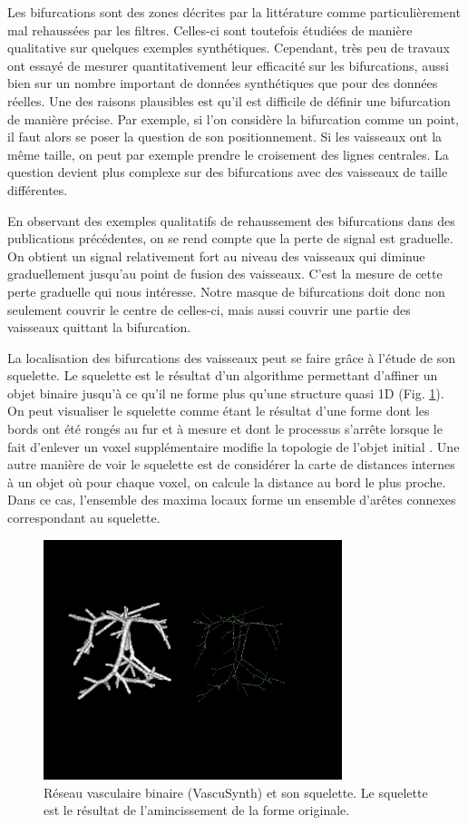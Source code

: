 Les bifurcations sont des zones décrites par la littérature comme particulièrement mal rehaussées par les filtres. Celles-ci sont toutefois étudiées de manière qualitative sur quelques exemples synthétiques. Cependant, très peu de travaux ont essayé de mesurer quantitativement leur efficacité sur les bifurcations, aussi bien sur un nombre important de données synthétiques que pour des données réelles. Une des raisons plausibles est qu'il est difficile de définir une bifurcation de manière précise. Par exemple, si l'on considère la bifurcation comme un point, il faut alors se poser la question de son positionnement. Si les vaisseaux ont la même taille, on peut par exemple prendre le croisement des lignes centrales. La question devient plus complexe sur des bifurcations avec des vaisseaux de taille différentes.

En observant des exemples qualitatifs de rehaussement des bifurcations dans des publications précédentes, on se rend compte que la perte de signal est graduelle. On obtient un signal relativement fort au niveau des vaisseaux qui diminue graduellement jusqu'au point de fusion des vaisseaux. C'est la mesure de cette perte graduelle qui nous intéresse. Notre masque de bifurcations doit donc non seulement couvrir le centre de celles-ci, mais aussi couvrir une partie des vaisseaux quittant la bifurcation.

La localisation des bifurcations des vaisseaux peut se faire grâce à l'étude de son squelette. Le squelette est le résultat d'un algorithme permettant d'affiner un objet binaire jusqu'à ce qu'il ne forme plus qu'une structure quasi 1D (Fig. \ref{fig:vascu_skeleton}). On peut visualiser le squelette comme étant le résultat d'une forme dont les bords ont été rongés au fur et à mesure et dont le processus s'arrête lorsque le fait d'enlever un voxel supplémentaire modifie la topologie de l'objet initial \cite{Lee1994_3D_skeleton}. Une autre manière de voir le squelette est de considérer la carte de distances internes à un objet où pour chaque voxel, on calcule la distance au bord le plus proche. Dans ce cas, l'ensemble des maxima locaux forme un ensemble d'arêtes connexes correspondant au squelette.

\begin{figure}[!ht]
  \centering
  \includegraphics[height=7cm]{Images/vascu_skeleton.png}
  \caption{Réseau vasculaire binaire (VascuSynth) et son squelette. Le squelette est le résultat de l'amincissement de la forme originale.}
  \label{fig:vascu_skeleton}
\end{figure}

